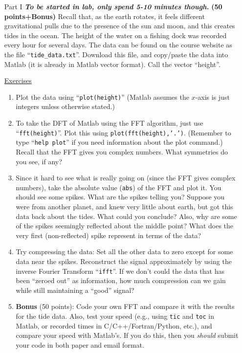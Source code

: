 \documentclass[11pt]{amsart}
\theoremstyle{plain}
\theoremstyle{definition}
\theoremstyle{remark}
\numberwithin{equation}{section} %
\numberwithin{figure}{section}   %
\begin{document}
\begin{itemize}
 \item[Part I] \textbf{\textit{To be started in lab, only spend 5-10 minutes though.}} \textbf{(50 points+Bonus)} Recall that, as the earth rotates, it feels different gravitational pulls due to the presence of the sun and moon, and this creates tides in the ocean.  The height of the water on a fishing dock was recorded every hour for several days.  The data can be found on the course website as the file ``\texttt{tide\_data.txt}''.  Download this file, and copy/paste the data into Matlab (it is already in Matlab vector format).  Call the vector ``height''.
 
 \underline{Exercises}
 
 \begin{enumerate}
  \item Plot the data using ``\texttt{plot(height)}'' (Matlab assumes the $x$-axis is just integers unless otherwise stated.)
  \item To take the DFT of Matlab using the FFT algorithm, just use ``\texttt{fft(height)}''.  Plot this using \texttt{plot(fft(height),'.')}. (Remember to type ``\texttt{help plot}'' if you need information about the plot command.) Recall that the FFT gives you complex numbers.  What symmetries do you see, if any?
  \item Since it hard to see what is really going on (since the FFT gives complex numbers), take the absolute value (\texttt{abs}) of the FFT and plot it.  You should see some spikes.  What are the spikes telling you?  Suppose you were from another planet, and knew very little about earth, but got this data back about the tides.  What could you conclude?  Also, why are some of the spikes seemingly reflected about the middle point?  What does the very first (non-reflected) spike represent in terms of the data?
  \item Try compressing the data: Set all the other data to zero except for some data near the spikes.  Reconstruct the signal approximately by using the inverse Fourier Transform ``\texttt{ifft}''.  If we don't could the data that has been ``zeroed out'' as information, how much compression can we gain while still maintaining a ``good'' signal?  
  
\item \textbf{Bonus} (50 points): Code your own FFT and compare it with the results for the tide data.  Also, test your speed (e.g., using \texttt{tic} and \texttt{toc} in Matlab, or recorded times in C/C++/Fortran/Python, etc.), and compare your speed with Matlab's.  If you do this, then you \textit{should} submit your code in both paper and email format.


\end{enumerate}
\end{itemize}
\end{document}
